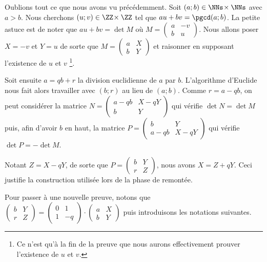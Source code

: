 Oublions tout ce que nous avons vu précédemment.
Soit $(a ; b) \in \NNs \!\times \NNs$ avec $a > b$. Nous cherchons $(u ; v) \in \ZZ \!\times \ZZ$ tel que $au + bv = \pgcd(a ; b)$. La petite astuce est de noter que $au + bv = \det M$ où 
$M 
 =
 \begin{pmatrix}
	a & -v \\ 
	b & u
 \end{pmatrix}$.
Nous allons poser $X = -v$ et $Y = u$ de sorte que 
$M 
 =
 \begin{pmatrix}
	a & X \\ 
	b & Y
 \end{pmatrix}$
 et raisonner en supposant l'existence de $u$ et $v$
 \footnote{
 	Ce n'est qu'à la fin de la preuve que nous aurons effectivement prouver l'existence de $u$ et $v$. 
 }.
 

\medskip


Soit ensuite $a = qb + r$ la division euclidienne de $a$ par $b$. L'algorithme d'Euclide nous fait alors travailler avec $(b ; r)$ au lieu de $(a ; b)$. Comme $r = a - qb$, on peut considérer la matrice
$N 
 =
 \begin{pmatrix}
	a - qb & X - qY \\ 
	b      & Y
 \end{pmatrix}$
qui vérifie $\det N = \det M$ puis, afin d'avoir $b$ en haut, la matrice
$P 
 =
 \begin{pmatrix}
	b      & Y      \\
	a - qb & X - qY 
 \end{pmatrix}$
qui vérifie $\det P = -\det M$.
 

\medskip


Notant $Z = X - qY$, de sorte que 
$P 
 =
 \begin{pmatrix}
	b & Y \\ 
	r & Z
 \end{pmatrix}$,
nous avons $X = Z + qY$. Ceci justifie la construction utilisée lors de la phase de remontée.
 

\bigskip


Pour passer à une nouvelle preuve, notons que
$\begin{pmatrix}
	b & Y \\ 
	r & Z
 \end{pmatrix}
 =
 \begin{pmatrix}
	0 & 1  \\ 
	1 & -q
 \end{pmatrix}
 \cdot
 \begin{pmatrix}
	a & X \\ 
	b & Y
 \end{pmatrix}$
puis introduisons les notations suivantes.

